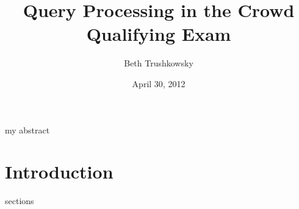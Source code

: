 \documentclass[twocolumn,10pt]{article}
\begin{document}
\title{Query Processing in the Crowd\\Qualifying Exam}
\author{Beth Trushkowsky}
\date{April 30, 2012}
\maketitle

\abstract
my abstract

\section{Introduction} 
sections

\begin{small}

\end{small}
\end{document}
